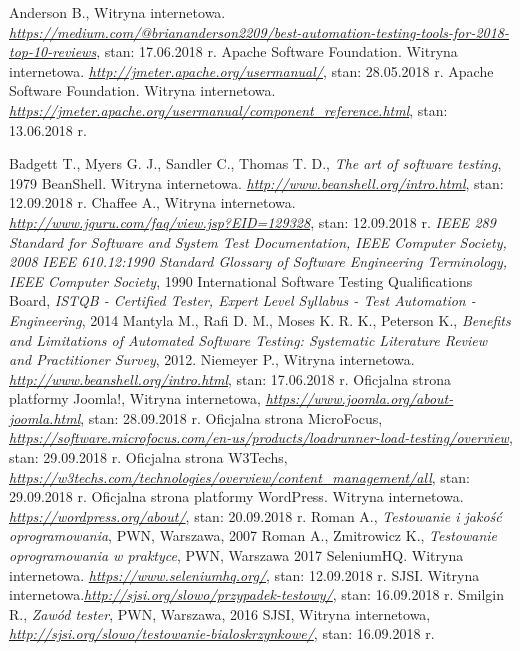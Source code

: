 \documentclass[12pt]{report}
\theoremstyle{definition}
\begin{document}
\newpage

\begin{thebibliography}{99}
Anderson B., Witryna internetowa.  \emph{\url{https://medium.com/@briananderson2209/best-automation-testing-tools-for-2018-top-10-reviews}}, stan: 17.06.2018 r.
Apache Software Foundation. Witryna internetowa. 
\emph{\url{http://jmeter.apache.org/usermanual/}}, stan: 28.05.2018 r.
Apache Software Foundation. Witryna internetowa. \emph{\url{https://jmeter.apache.org/usermanual/component_reference.html}}, stan: 13.06.2018 r.

Badgett T., Myers G. J., Sandler C., Thomas T. D., \emph{The art of software testing}, 1979
BeanShell. Witryna internetowa. \emph{\url{http://www.beanshell.org/intro.html}}, stan: 12.09.2018 r.
Chaffee A., Witryna internetowa. \emph{\url{http://www.jguru.com/faq/view.jsp?EID=129328}}, stan: 12.09.2018 r.
\emph{IEEE 289 Standard for Software and System Test Documentation, IEEE Computer Society, 2008}
\emph{IEEE 610.12:1990 Standard Glossary of Software Engineering Terminology, IEEE Computer Society}, 1990
 International Software Testing Qualifications Board, \emph{ISTQB - Certified Tester, Expert Level Syllabus - Test Automation - Engineering}, 2014
 Mantyla M., Rafi D. M., Moses K. R. K., Peterson K., \emph{Benefits and Limitations of Automated Software Testing: Systematic Literature
Review and Practitioner Survey}, 2012.
 Niemeyer P., Witryna internetowa. \emph{\url{http://www.beanshell.org/intro.html}}, stan: 17.06.2018 r.
 Oficjalna strona platformy Joomla!, Witryna internetowa, \emph{\url{https://www.joomla.org/about-joomla.html}}, stan: 28.09.2018 r.
 Oficjalna strona MicroFocus, \emph{\url{https://software.microfocus.com/en-us/products/loadrunner-load-testing/overview}}, stan: 29.09.2018 r.
Oficjalna strona W3Techs, \emph{\url{https://w3techs.com/technologies/overview/content_management/all}}, stan: 29.09.2018 r.
Oficjalna strona platformy WordPress. Witryna internetowa. \emph{\url{https://wordpress.org/about/}}, stan: 20.09.2018 r.
Roman A., \emph{Testowanie i jakość oprogramowania}, PWN, Warszawa, 2007
Roman A., Zmitrowicz K., \emph{Testowanie oprogramowania w praktyce}, PWN, Warszawa 2017
SeleniumHQ. Witryna internetowa. \emph{\url{https://www.seleniumhq.org/}}, stan: 12.09.2018 r.
SJSI. Witryna internetowa.\emph{\url{http://sjsi.org/slowo/przypadek-testowy/}}, stan: 16.09.2018 r.
Smilgin R., \emph{Zawód tester}, PWN, Warszawa, 2016
SJSI, Witryna internetowa, \emph{\url{http://sjsi.org/slowo/testowanie-bialoskrzynkowe/}}, stan: 16.09.2018 r.



\end{thebibliography}


\begingroup
  \let\captionlinebreak\relax
  \listoffigures
\endgroup

\listoftables
\end{document}
